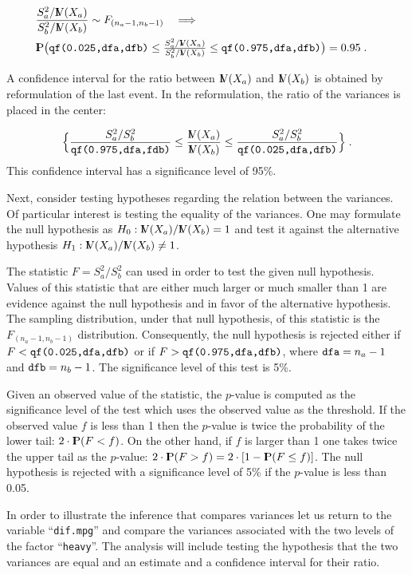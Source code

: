 \documentclass[]{krantz}
\newcommand{\Prob}{{\rm I\kern-.3em P}}
\newcommand{\Var}{{\rm I\kern-.3em V}}
\theoremstyle{definition}
\theoremstyle{definition}
\theoremstyle{definition}
\theoremstyle{remark}
\begin{document}
\[\begin{aligned}
\lefteqn{\frac{S_a^2/\Var(X_a)}{S_b^2/\Var(X_b)} \sim F_{(n_a-1,n_b-1)} \quad \Longrightarrow }\\ & \Prob \big( \mbox{\texttt{qf(0.025,dfa,dfb)}} \leq  {\textstyle \frac{S_a^2/\Var(X_a)}{S_b^2/\Var(X_b)}}  \leq \mbox{\texttt{qf(0.975,dfa,dfb)}} \big) = 0.95\;.\end{aligned}\]

A confidence interval for the ratio between \(\Var(X_a)\) and
\(\Var(X_b)\) is obtained by reformulation of the last event. In the
reformulation, the ratio of the variances is placed in the center:

\[\Big\{\frac{S_a^2/S_b^2}{\mbox{\texttt{qf(0.975,dfa,fdb)}}} \leq  \frac{\Var(X_a)}{\Var(X_b)}  \leq \frac{S_a^2/S_b^2}{\mbox{\texttt{qf(0.025,dfa,dfb)}}}\Big\}\;.\]
This confidence interval has a significance level of 95\%.

Next, consider testing hypotheses regarding the relation between the
variances. Of particular interest is testing the equality of the
variances. One may formulate the null hypothesis as
\(H_0: \Var(X_a)/\Var(X_b) = 1\) and test it against the alternative
hypothesis \(H_1: \Var(X_a)/\Var(X_b) \not = 1\).

The statistic \(F = S_a^2/S_b^2\) can used in order to test the given
null hypothesis. Values of this statistic that are either much larger or
much smaller than 1 are evidence against the null hypothesis and in
favor of the alternative hypothesis. The sampling distribution, under
that null hypothesis, of this statistic is the \(F_{(n_a-1,n_b-1)}\)
distribution. Consequently, the null hypothesis is rejected either if
\(F < \mbox{\texttt{qf(0.025,dfa,dfb)}}\) or if
\(F >\mbox{\texttt{qf(0.975,dfa,dfb)}}\), where
\(\mbox{\texttt{dfa}} = n_a - 1\) and \(\mbox{\texttt{dfb}} = n_b - 1\).
The significance level of this test is 5\%.

Given an observed value of the statistic, the \(p\)-value is computed as
the significance level of the test which uses the observed value as the
threshold. If the observed value \(f\) is less than 1 then the
\(p\)-value is twice the probability of the lower tail:
\(2\cdot \Prob(F < f)\). On the other hand, if \(f\) is larger than 1
one takes twice the upper tail as the \(p\)-value:
\(2\cdot \Prob(F > f) = 2\cdot [1-\Prob(F \leq f)]\). The null
hypothesis is rejected with a significance level of 5\% if the
\(p\)-value is less than 0.05.

In order to illustrate the inference that compares variances let us
return to the variable ``\texttt{dif.mpg}'' and compare the variances
associated with the two levels of the factor ``\texttt{heavy}''. The
analysis will include testing the hypothesis that the two variances are
equal and an estimate and a confidence interval for their ratio.
\end{document}
